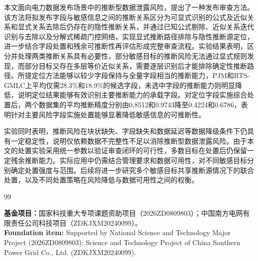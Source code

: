 \documentclass[UTF8,zihao=5,twoside,fontset=none]{ctexart}
\begin{document}
本文面向电力数据发布场景中的推断型数据泄露风险，提出了一种发布审查方法。该方法将拟发布字段与敏感信息之间的推断关系区分为可显式识别的公式及近似关系和显式关系去除后仍存在的隐性推断关系，并通过已知公式剔除、近似关系迭代识别与去除以及分解式稀疏门控网络，实现显式推断路径排除与隐性推断源定位，进一步结合字段处置和残余可推断性再评估形成完整审查流程。实验结果表明，区分并处理两类推断关系具有必要性，部分敏感目标的推断风险无法通过显式规则发现，而部分目标又存在多层等价近似关系，需要逐层识别后才能排除确定性推断路径。所提定位方法能够以较少字段保持与全量字段相当的推断能力，PJM和RTS-GMLC上平均仅需28.3\%和18.9\%的候选字段，未选中字段的推断能力则明显降低，说明定位结果能够有效识别主要推断能力的承载字段。对定位字段实施综合处置后，两个数据集的平均推断精度分别由0.8512和0.9743降至0.4224和0.6786，表明针对主要风险字段实施处置能够显著降低敏感信息的可推断性。

实验同时表明，推断风险在块状缺失、字段缺失和数据延迟等数据降级条件下仍具有一定稳定性，说明仅依赖数据不完整性不足以消除推断型数据泄露风险。由于本文的处置实验采用统一参数以验证审查闭环的可行性，多数目标在处置后仍保留一定残余推断能力。实际应用中仍需结合管理要求和数据可用性，对不同敏感目标分别确定处置强度与范围。后续将进一步研究多个敏感目标共享推断源情况下的联合处置，以及不同处置策略在风险降低与数据可用性之间的权衡。

\balance
\begin{thebibliography}{99}
\setlength{\itemsep}{0.15ex}\setlength{\parskip}{0pt}

\end{thebibliography}

\vspace{0.6em}
\noindent\begin{minipage}{\columnwidth}
{\textbf{基金项目：}国家科技重大专项课题资助项目（2026ZD0809803）；中国南方电网有限责任公司科技项目（ZDKJXM20240099）。\\
\textbf{Foundation item:} Supported by National Science and Technology Major Project (2026ZD0809803); Science and Technology Project of China Southern Power Grid Co., Ltd. (ZDKJXM20240099).}
\end{minipage}

\vspace{0.6em}
\end{document}
